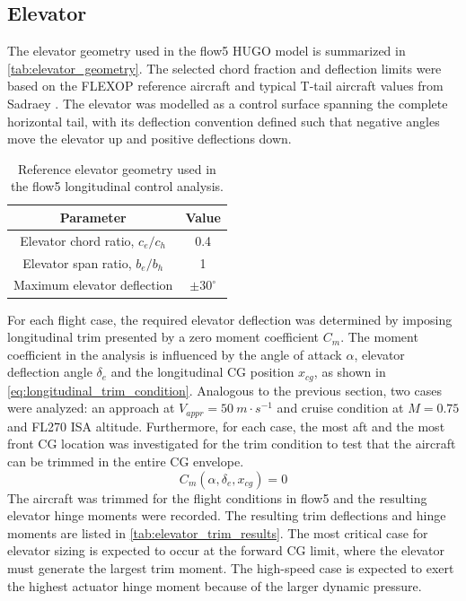 



\subsection{Elevator}
\label{subsec:elevator} 

The elevator geometry used in the flow5 HUGO model is summarized in \autoref{tab:elevator_geometry}. The selected chord fraction and deflection limits were based on the FLEXOP reference aircraft and typical T-tail aircraft values from Sadraey \cite[ch. 12.5.2]{sadraey2012aircraftdesign}. The elevator was modelled as a control surface spanning the complete horizontal tail, with its deflection convention defined such that negative angles move the elevator up and positive deflections down.

\begin{table}[H]
    \centering
    \caption{Reference elevator geometry used in the flow5 longitudinal control analysis.}
    \label{tab:elevator_geometry}
    \begin{tabular}{|c|c|}
        \hline
        \textbf{Parameter} & \textbf{Value} \\
        \hline\hline
        Elevator chord ratio, \(c_e/c_h\) & 0.4 \\
        \hline
        Elevator span ratio, \(b_e/b_h\) & 1 \\
        \hline
        Maximum elevator deflection & $\pm 30^\circ$ \\
        \hline
    \end{tabular}
\end{table}

For each flight case, the required elevator deflection was determined by imposing longitudinal trim presented by a zero moment coefficient $C_m$. The moment coefficient in the analysis is influenced by the angle of attack $\alpha$, elevator deflection angle $\delta_e$ and the longitudinal CG position $x_{cg}$, as shown in \autoref{eq:longitudinal_trim_condition}. Analogous to the previous section, two cases were analyzed: an approach at $V_{appr} = 50 \ m\cdot s^{-1}$ and cruise condition at $M = 0.75$ and FL270 ISA altitude. Furthermore, for each case, the most aft and the most front CG location was investigated for the trim condition to test that the aircraft can be trimmed in the entire CG envelope.
\begin{equation}
    C_m(\alpha,\delta_e,x_{cg}) = 0
    \label{eq:longitudinal_trim_condition}
\end{equation}
The aircraft was trimmed for the flight conditions in flow5 and the resulting elevator hinge moments were recorded. The resulting trim deflections and hinge moments are listed in \autoref{tab:elevator_trim_results}. The most critical case for elevator sizing is expected to occur at the forward CG limit, where the elevator must generate the largest trim moment. The high-speed case is expected to exert the highest actuator hinge moment because of the larger dynamic pressure.


